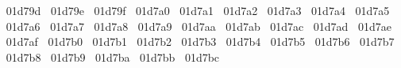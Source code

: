 {  ^^^^^^01d79d%
  ^^^^^^01d79e%
  ^^^^^^01d79f%
  ^^^^^^01d7a0%
  ^^^^^^01d7a1%
  ^^^^^^01d7a2%
  ^^^^^^01d7a3%
  ^^^^^^01d7a4%
  ^^^^^^01d7a5%
  ^^^^^^01d7a6%
  ^^^^^^01d7a7%
  ^^^^^^01d7a8%
  ^^^^^^01d7a9%
  ^^^^^^01d7aa%
  ^^^^^^01d7ab%
  ^^^^^^01d7ac%
  ^^^^^^01d7ad%
  ^^^^^^01d7ae%
  ^^^^^^01d7af%
  ^^^^^^01d7b0%
  ^^^^^^01d7b1%
  ^^^^^^01d7b2%
  ^^^^^^01d7b3%
  ^^^^^^01d7b4%
  ^^^^^^01d7b5%
  ^^^^^^01d7b6%
  ^^^^^^01d7b7%
  ^^^^^^01d7b8%
  ^^^^^^01d7b9%
  ^^^^^^01d7ba%
  ^^^^^^01d7bb%
  ^^^^^^01d7bc%
}
